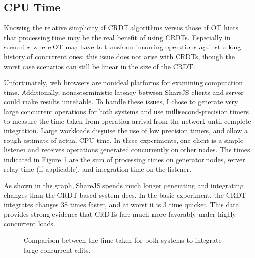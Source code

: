 \documentclass[12pt,a4paper,twoside,openright]{report}
\begin{document}
		
	
		\subsection{CPU Time}
			Knowing the relative simplicity of CRDT algorithms versus those of OT hints that processing time may be the real benefit of using CRDTs. Especially in scenarios where OT may have to transform incoming operations against a long history of concurrent ones; this issue does not arise with CRDTs, though the worst case scenarios can still be linear in the size of the CRDT.
			
			Unfortunately, web browsers are nonideal platforms for examining computation time. Additionally, nondeterministic latency between ShareJS clients and server could make results unreliable. To handle these issues, I chose to generate very large concurrent operations for both systems and use millisecond-precision timers to measure the time taken from operation arrival from the network until complete integration. Large workloads disguise the use of low precision timers, and allow a rough estimate of actual CPU time. In these experiments, one client is a simple listener and receives operations generated concurrently on other nodes. The times indicated in Figure \ref{fig:cputime} are the sum of processing times on generator nodes, server relay time (if applicable), and integration time on the listener.
			
			As shown in the graph, ShareJS spends much longer generating and integrating changes than the CRDT based system does. In the basic experiment, the CRDT integrates changes 38 times faster, and at worst it is 3 time quicker. This data provides strong evidence that CRDTs fare much more favorably under highly concurrent loads.
			
			\begin{figure}[htb]
				\centering
				
				\caption[CPU Time] {Comparison between the time taken for both systems to integrate large concurrent edits.}
				\label{fig:cputime}
			\end{figure}
	
	
	

		
		
		
	
		
		
		
		
		
		
\end{document}

